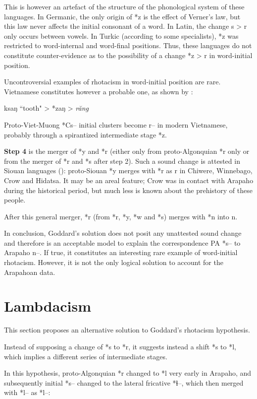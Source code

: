\documentclass[oldfontcommands,oneside,a4paper,11pt]{article}
\begin{document}
This is however an artefact of the structure of the phonological system of these languages. In Germanic, the only origin of *z is the effect of Verner's law, but this law never affects the initial consonant of a word. In Latin, the change s > r only occurs between vowels. In Turkic (according to some specialists), *z was restricted to word-internal and word-final positions. Thus, these languages do not constitute counter-evidence as to the possibility of a change *z > r in word-initial position. 


Uncontroversial examples of rhotacism in word-initial position are rare.  Vietnamese constitutes however a probable one, as shown by \citet{ferlus82spirantisation}:
 \begin{exe}
\ex
\glt *ksaŋ ``tooth" > *zaŋ > \textit{răng}
\end{exe}

Proto-Viet-Muong *Cs-- initial clusters become r-- in modern Vietnamese, probably through a spirantized intermediate stage *z.

\textbf{Step 4 } is the merger of *y and  *r (either only from proto-Algonquian *r only or from the merger of *r and *s after step 2). Such a sound change is attested in Siouan languages (\citealt{csd2006}): proto-Siouan *y merges with *r as r in Chiwere, Winnebago, Crow and Hidatsa. It may be an areal feature; Crow was in contact with Arapaho during the historical period, but much less is known about the prehistory of these people.

After this general merger,  *r (from  *r, *y, *w and *s) merges with *n into n.

In conclusion,  Goddard's solution does not posit any unattested sound change and therefore is an acceptable model to explain the correspondence PA *s-- to Arapaho n--. If true, it constitutes an interesting rare example of word-initial rhotacism. However, it is not the only logical solution to account for the Arapahoan data.

\section{Lambdacism}
This section proposes an alternative solution to Goddard's rhotacism hypothesis.

Instead of supposing a change of *s to *r, it suggests instead a shift *s to *l, which implies a different series of intermediate stages.

In this hypothesis,  proto-Algonquian *r changed to *l very early in Arapaho, and  subsequently initial *s-- changed to the lateral fricative *ɬ--, which then merged with *l-- as *l--:
\end{document}
